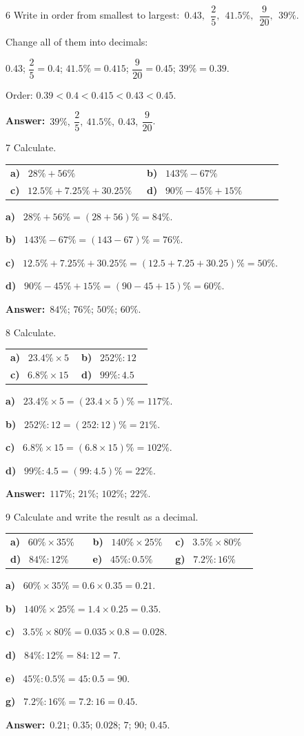 \documentclass[11pt]{article}
\makeatletter
\newif\ifsol \solfalse
\renewcommand{\arraystretch}{1.35}
\providecommand{\AnsWord}{Đáp số}
\newcommand{\dapso}[1]{\par\textbf{\AnsWord:}\ #1}
\newcommand{\probsol}[1]{%
  \begin{lrbox}{\solmeasure}\begin{minipage}{\dimexpr\linewidth-24pt\relax}#1\end{minipage}\end{lrbox}%
  \ifsol
    \begin{solbox}#1\end{solbox}%
  \else
    \setlength{\solht}{\dimexpr\ht\solmeasure+\dp\solmeasure+0.85cm\relax}%
    \ifdim\solht<1.35cm\setlength{\solht}{1.35cm}\fi
    \begin{tcolorbox}[colback=white,colframe=Line,boxrule=0.8pt,arc=5pt,
      left=8pt,right=8pt,top=4pt,bottom=4pt,height=\solht]{\footnotesize\color{Slate}\itshape\WorkWord}\end{tcolorbox}%
  \fi}
\newcommand{\pa}[1]{\textbf{#1)}\ }
\newenvironment{cols2}{\par\vspace{3pt}\noindent\setlength{\tabcolsep}{0pt}\renewcommand{\arraystretch}{1.3}%
  \begin{tabular}{@{}>{\raggedright\arraybackslash\rule{0pt}{4.4ex}}p{0.48\linewidth}<{\rule[-2.3ex]{0pt}{0pt}}@{\hspace{0.03\linewidth}}>{\raggedright\arraybackslash\rule{0pt}{4.4ex}}p{0.48\linewidth}<{\rule[-2.3ex]{0pt}{0pt}}@{}}}%
  {\end{tabular}\par}
\newenvironment{cols3}{\par\vspace{3pt}\noindent\setlength{\tabcolsep}{0pt}\renewcommand{\arraystretch}{1.3}%
  \begin{tabular}{@{}>{\raggedright\arraybackslash\rule{0pt}{4.4ex}}p{0.32\linewidth}<{\rule[-2.3ex]{0pt}{0pt}}@{\hspace{0.015\linewidth}}>{\raggedright\arraybackslash\rule{0pt}{4.4ex}}p{0.32\linewidth}<{\rule[-2.3ex]{0pt}{0pt}}@{\hspace{0.015\linewidth}}>{\raggedright\arraybackslash\rule{0pt}{4.4ex}}p{0.32\linewidth}<{\rule[-2.3ex]{0pt}{0pt}}@{}}}%
  {\end{tabular}\par}
\newcommand{\gap}{\vspace{0.3cm}}
\def\WorkWord{Your work:}
\def\AnsWord{Answer}
\makeatother
\begin{document}
\gap
\begin{probbox}{6}{\relax}
Write in order from smallest to largest: $\ 0.43,\ \ \dfrac25,\ \ 41.5\%,\ \ \dfrac9{20},\ \ 39\%$.
\end{probbox}
\probsol{
Change all of them into decimals:\par
$0.43$; \quad $\dfrac25=0.4$; \quad $41.5\%=0.415$; \quad $\dfrac9{20}=0.45$; \quad $39\%=0.39$.\par
Order: $0.39<0.4<0.415<0.43<0.45$.
\dapso{$39\%,\ \dfrac25,\ 41.5\%,\ 0.43,\ \dfrac9{20}$.}}
\gap
\begin{probbox}{7}{\relax}
Calculate.
\begin{cols2}
\pa{a} $28\%+56\%$ & \pa{b} $143\%-67\%$\\
\pa{c} $12.5\%+7.25\%+30.25\%$ & \pa{d} $90\%-45\%+15\%$
\end{cols2}
\end{probbox}
\probsol{
\pa{a} $28\%+56\%=(28+56)\%=84\%$.\par
\pa{b} $143\%-67\%=(143-67)\%=76\%$.\par
\pa{c} $12.5\%+7.25\%+30.25\%=(12.5+7.25+30.25)\%=50\%$.\par
\pa{d} $90\%-45\%+15\%=(90-45+15)\%=60\%$.
\dapso{$84\%$; $76\%$; $50\%$; $60\%$.}}
\gap
\begin{probbox}{8}{\relax}
Calculate.
\begin{cols2}
\pa{a} $23.4\%\times5$ & \pa{b} $252\%:12$\\
\pa{c} $6.8\%\times15$ & \pa{d} $99\%:4.5$
\end{cols2}
\end{probbox}
\probsol{
\pa{a} $23.4\%\times5=(23.4\times5)\%=117\%$.\par
\pa{b} $252\%:12=(252:12)\%=21\%$.\par
\pa{c} $6.8\%\times15=(6.8\times15)\%=102\%$.\par
\pa{d} $99\%:4.5=(99:4.5)\%=22\%$.
\dapso{$117\%$; $21\%$; $102\%$; $22\%$.}}
\gap
\begin{probbox}{9}{\relax}
Calculate and write the result as a decimal.
\begin{cols3}
\pa{a} $60\%\times35\%$ & \pa{b} $140\%\times25\%$ & \pa{c} $3.5\%\times80\%$\\
\pa{d} $84\%:12\%$ & \pa{e} $45\%:0.5\%$ & \pa{g} $7.2\%:16\%$
\end{cols3}
\end{probbox}
\probsol{
\pa{a} $60\%\times35\%=0.6\times0.35=0.21$.\par
\pa{b} $140\%\times25\%=1.4\times0.25=0.35$.\par
\pa{c} $3.5\%\times80\%=0.035\times0.8=0.028$.\par
\pa{d} $84\%:12\%=84:12=7$.\par
\pa{e} $45\%:0.5\%=45:0.5=90$.\par
\pa{g} $7.2\%:16\%=7.2:16=0.45$.
\dapso{$0.21$; $0.35$; $0.028$; $7$; $90$; $0.45$.}}
\end{document}
